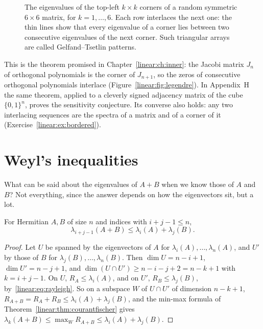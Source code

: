 \begin{figure}[ht]
\centering
{}
\caption{The eigenvalues of the top-left $k\times k$ corners of a random symmetric $6\times6$ matrix, for $k=1,\dots,6$.
Each row interlaces the next one: the thin lines show that every eigenvalue of a corner lies between two consecutive
eigenvalues of the next corner. Such triangular arrays are called Gelfand--Tsetlin patterns.}
\label{linear:fig:interlace}
\end{figure}

This is the theorem promised in Chapter~\ref{linear:ch:inner}: the Jacobi matrix $J_n$ of orthogonal polynomials is the corner of
$J_{n+1}$, so the zeros of consecutive orthogonal polynomials interlace (Figure~\ref{linear:fig:legendre}). In Appendix~H the same
theorem, applied to a cleverly signed adjacency matrix of the cube $\{0,1\}^n$, proves the sensitivity conjecture. Its converse
also holds: any two interlacing sequences are the spectra of a matrix and of a corner of it (Exercise~\ref{linear:ex:bordered}).

\section{Weyl's inequalities}

What can be said about the eigenvalues of $A+B$ when we know those of $A$ and $B$? Not everything, since the answer depends
on how the eigenvectors sit, but a lot.

\begin{theorem}[Weyl, 1912]\label{linear:thm:weyl}
For Hermitian $A,B$ of size $n$ and indices with $i+j-1\le n$,
\[
\lambda_{i+j-1}(A+B)\le\lambda_i(A)+\lambda_j(B).
\]
\end{theorem}
\begin{proof}
Let $U$ be spanned by the eigenvectors of $A$ for $\lambda_i(A),\dots,\lambda_n(A)$, and $U'$ by those of $B$ for
$\lambda_j(B),\dots,\lambda_n(B)$. Then $\dim U=n-i+1$, $\dim U'=n-j+1$, and $\dim(U\cap U')\ge n-i-j+2=n-k+1$ with
$k=i+j-1$. On $U$, $R_A\le\lambda_i(A)$, and on $U'$, $R_B\le\lambda_j(B)$, by~\eqref{linear:eq:rayleigh}. So on a subspace $W$ of
$U\cap U'$ of dimension $n-k+1$, $R_{A+B}=R_A+R_B\le\lambda_i(A)+\lambda_j(B)$, and the min-max formula of
Theorem~\ref{linear:thm:courantfischer} gives $\lambda_k(A+B)\le\max_WR_{A+B}\le\lambda_i(A)+\lambda_j(B)$.
\end{proof}

